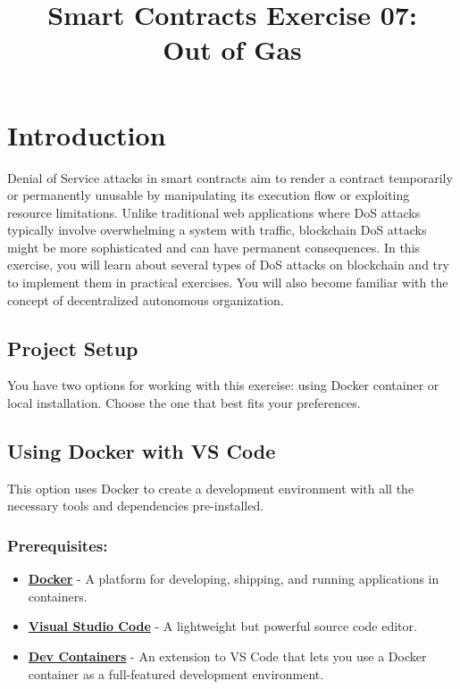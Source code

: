 \documentclass[12pt]{article}
\title{Smart Contracts Exercise 07: \\ Out of Gas}
\author{}
\date{}
\begin{document}
\maketitle
\section{Introduction}

Denial of Service attacks in smart contracts aim to render a contract
temporarily or permanently unusable by manipulating its execution flow or
exploiting resource limitations. Unlike traditional web applications where DoS
attacks typically involve overwhelming a system with traffic, blockchain DoS
attacks might be more sophisticated and can have permanent consequences. In
this exercise, you will learn about several types of DoS attacks on blockchain
and try to implement them in practical exercises. You will also become familiar
with the concept of decentralized autonomous organization.

\subsection*{Project Setup}

You have two options for working with this exercise: using Docker container or
local installation. Choose the one that best fits your preferences.

\subsection{Using Docker with VS Code}

This option uses Docker to create a development environment with all the
necessary tools and dependencies pre-installed.

\subsubsection*{Prerequisites:}

\begin{itemize}
    \item \textbf{\href{https://www.docker.com/products/docker-desktop}{Docker}} - A platform for developing, shipping, and running applications in containers.
    \item \textbf{\href{https://code.visualstudio.com/}{Visual Studio Code}} - A lightweight but powerful source code editor.
    \item \textbf{\href{https://marketplace.visualstudio.com/items?itemName=ms-vscode-remote.remote-containers}{Dev Containers}} - An extension to VS Code that lets you use a Docker container as a full-featured development environment.
\end{itemize}
\end{document}
